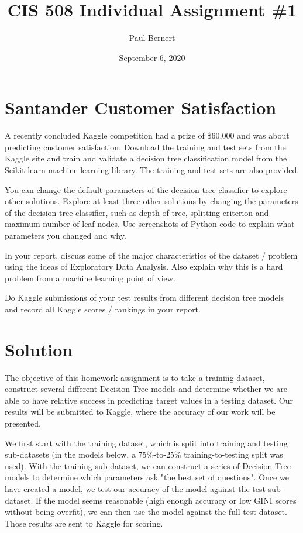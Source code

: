 \documentclass[notitlepage]{report}
\title{CIS 508 Individual Assignment \#1}
\author{Paul Bernert}
\date{September 6, 2020}
\begin{document}
\maketitle
\thispagestyle{empty}

\section*{Santander Customer Satisfaction}
A recently concluded Kaggle competition had a prize of \$60,000 and was about predicting customer satisfaction. Download the training and test sets from the Kaggle site and train and validate a decision tree classification model from the Scikit-learn machine learning library. The training and test sets are also provided.

You can change the default parameters of the decision tree classifier to explore other solutions. Explore at least three other solutions by changing the parameters of the decision tree classifier, such as depth of tree, splitting criterion and maximum number of leaf nodes. Use screenshots of Python code to explain what parameters you changed and why.

In your report, discuss some of the major characteristics of the dataset / problem using the ideas of Exploratory Data Analysis. Also explain why this is a hard problem from a machine learning point of view. 

Do Kaggle submissions of your test results from different decision tree models and record all Kaggle scores / rankings in your report.

\section*{Solution}
The objective of this homework assignment is to take a training dataset, construct several different Decision Tree models and determine whether we are able to have relative success in predicting target values in a testing dataset. Our results will be submitted to Kaggle, where the accuracy of our work will be presented.

We first start with the training dataset, which is split into training and testing sub-datasets (in the models below, a 75\%-to-25\% training-to-testing split was used). With the training sub-dataset, we can construct a series of Decision Tree models to determine which parameters ask "the best set of questions". Once we have created a model, we test our accuracy of the model against the test sub-dataset. If the model seems reasonable (high enough accuracy or low GINI scores without being overfit), we can then use the model against the full test dataset. Those results are sent to Kaggle for scoring.
\end{document}
